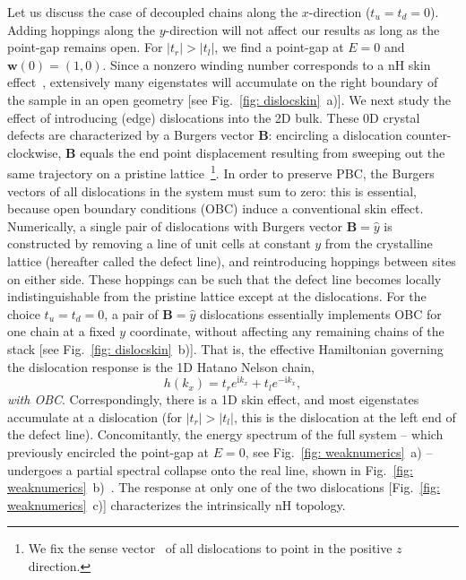 \documentclass[aps,prl,twocolumn,amsmath,amssymb,floatfix,superscriptaddress]{revtex4-2}
\newcommand{\bs}[1]{\boldsymbol{#1}}
\begin{document}
Let us discuss the case of decoupled chains along the $x$-direction ($t_u = t_d = 0$). Adding hoppings along the $y$-direction will not affect our results as long as the point-gap remains open. For $|t_r| > |t_l|$, we find a point-gap at $E = 0$ and $\bs{w}(0) = (1,0)$. Since a nonzero winding number corresponds to a nH skin effect~\cite{zhang2020correspondence,TopoSkin20}, extensively many eigenstates will accumulate on the right boundary of the sample in an open geometry [see Fig.~\ref{fig: dislocskin}~a)]. We next study the effect of introducing (edge) dislocations into the 2D bulk. These 0D crystal defects are characterized by a Burgers vector $\bs{B}$: encircling a dislocation counter-clockwise, $\bs{B}$ equals the end point displacement resulting from sweeping out the same trajectory on a pristine lattice~\footnote{We fix the sense vector~\cite{bollmann2012crystal} of all dislocations to point in the positive $z$ direction.}. In order to preserve PBC, the Burgers vectors of all dislocations in the system must sum to zero: this is essential, because open boundary conditions (OBC) induce a conventional skin effect. Numerically, a single pair of dislocations with Burgers vector $\bs{B} = \hat{y}$ is constructed by removing a line of unit cells at constant $y$ from the crystalline lattice (hereafter called the defect line), and reintroducing hoppings between sites on either side. These hoppings can be such that the defect line becomes locally indistinguishable from the pristine lattice except at the dislocations. For the choice $t_u = t_d = 0$, a pair of $\bs{B} = \hat{y}$ dislocations essentially implements OBC for one chain at a fixed $y$ coordinate, without affecting any remaining chains of the stack [see Fig.~\ref{fig: dislocskin}~b)]. That is, the effective Hamiltonian governing the dislocation response is the 1D Hatano Nelson chain,
\begin{equation} \label{eq: 1DHatanoNelson}
h(k_x) = t_r e^{\mathrm{i} k_x} + t_l e^{-\mathrm{i} k_x},
\end{equation}
\emph{with OBC}. Correspondingly, there is a 1D skin effect, and most eigenstates accumulate at a dislocation (for $|t_r| > |t_l|$, this is the dislocation at the left end of the defect line). Concomitantly, the energy spectrum of the full system -- which previously encircled the point-gap at $E=0$, see Fig.~\ref{fig: weaknumerics}~a) -- undergoes a partial spectral collapse onto the real line, shown in Fig.~\ref{fig: weaknumerics}~b)~\cite{Zhang:2020, Sato-PRL:2020}. The response at only one of the two dislocations [Fig.~\ref{fig: weaknumerics}~c)] characterizes the intrinsically nH topology.
\end{document}
